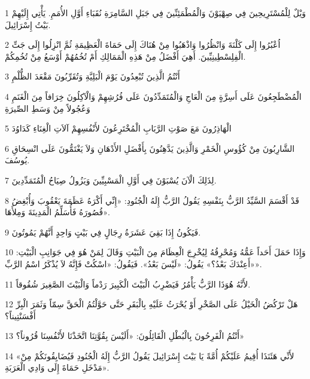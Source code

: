\par 1 وَيْلٌ لِلْمُسْتَرِيحِينَ فِي صِهْيَوْنَ وَالْمُطْمَئِنِّينَ فِي جَبَلِ السَّامِرَةِ نُقَبَاءِ أَوَّلِ الأُمَمِ. يَأْتِي إِلَيْهِمْ بَيْتُ إِسْرَائِيلَ.
\par 2 اُعْبُرُوا إِلَى كَلْنَةَ وَانْظُرُوا وَاذْهَبُوا مِنْ هُنَاكَ إِلَى حَمَاةَ الْعَظِيمَةِ ثُمَّ انْزِلُوا إِلَى جَتِّ الْفِلِسْطِينِيِّينَ. أَهِيَ أَفْضَلُ مِنْ هَذِهِ الْمَمَالِكِ أَمْ تُخُمُهُمْ أَوْسَعُ مِنْ تُخُمِكُمْ.
\par 3 أَنْتُمُ الَّذِينَ تُبْعِدُونَ يَوْمَ الْبَلِيَّةِ وَتُقَرِّبُونَ مَقْعَدَ الظُّلْمِ
\par 4 الْمُضْطَجِعُونَ عَلَى أَسِرَّةٍ مِنَ الْعَاجِ وَالْمُتَمَدِّدُونَ عَلَى فُرُشِهِمْ وَالْآكِلُونَ خِرَافاً مِنَ الْغَنَمِ وَعُجُولاً مِنْ وَسَطِ الصِّيرَةِ
\par 5 الْهَاذِرُونَ مَعَ صَوْتِ الرَّبَابِ الْمُخْتَرِعُونَ لأَنْفُسِهِمْ آلاَتِ الْغِنَاءِ كَدَاوُدَ
\par 6 الشَّارِبُونَ مِنْ كُؤُوسِ الْخَمْرِ وَالَّذِينَ يَدَّهِنُونَ بِأَفْضَلِ الأَدْهَانِ وَلاَ يَغْتَمُّونَ عَلَى انْسِحَاقِ يُوسُفَ.
\par 7 لِذَلِكَ الْآنَ يُسْبَوْنَ فِي أَوَّلِ الْمَسْبِيِّينَ وَيَزُولُ صِيَاحُ الْمُتَمَدِّدِينَ.
\par 8 قَدْ أَقْسَمَ السَّيِّدُ الرَّبُّ بِنَفْسِهِ يَقُولُ الرَّبُّ إِلَهُ الْجُنُودِ: «إِنِّي أَكْرَهُ عَظَمَةَ يَعْقُوبَ وَأُبْغِضُ قُصُورَهُ فَأُسَلِّمُ الْمَدِينَةَ وَمِلأَهَا».
\par 9 فَيَكُونُ إِذَا بَقِيَ عَشَرَةُ رِجَالٍ فِي بَيْتٍ وَاحِدٍ أَنَّهُمْ يَمُوتُونَ.
\par 10 وَإِذَا حَمَلَ أَحَداً عَمُّهُ وَمُحْرِقُهُ لِيُخْرِجَ الْعِظَامَ مِنَ الْبَيْتِ وَقَالَ لِمَنْ هُوَ فِي جَوَانِبِ الْبَيْتِ: «أَعِنْدَكَ بَعْدُ؟» يَقُولُ: «لَيْسَ بَعْدُ». فَيَقُولُ: «اسْكُتْ فَإِنَّهُ لاَ يُذْكَرُ اسْمُ الرَّبِّ».
\par 11 لأَنَّهُ هُوَذَا الرَّبُّ يَأْمُرُ فَيَضْرِبُ الْبَيْتَ الْكَبِيرَ رَدْماً وَالْبَيْتَ الصَّغِيرَ شُقُوقاً.
\par 12 هَلْ تَرْكُضُ الْخَيْلُ عَلَى الصَّخْرِ أَوْ يُحْرَثُ عَلَيْهِ بِالْبَقَرِ حَتَّى حَوَّلْتُمُ الْحَقَّ سِمّاً وَثَمَرَ الْبِرِّ أَفْسَنْتِيناً؟
\par 13 أَنْتُمُ الْفَرِحُونَ بِالْبُطْلِ الْقَائِلُونَ: «أَلَيْسَ بِقُوَّتِنَا اتَّخَذْنَا لأَنْفُسِنَا قُرُوناً؟»
\par 14 «لأَنِّي هَئَنَذَا أُقِيمُ عَلَيْكُمْ أُمَّةً يَا بَيْتَ إِسْرَائِيلَ يَقُولُ الرَّبُّ إِلَهُ الْجُنُودِ فَيُضَايِقُونَكُمْ مِنْ مَدْخَلِ حَمَاةَ إِلَى وَادِي الْعَرَبَةِ».

